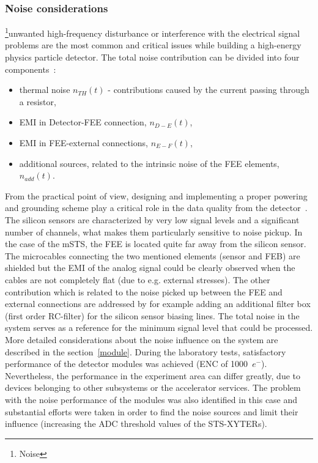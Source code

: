 \subsubsection{Noise considerations}
\footnote{Noise}{unwanted high-frequency disturbance or interference with the electrical signal} problems are the most common and critical issues while building a high-energy physics particle detector. The total noise contribution can be divided into four components~\cite{noise_twepp2008}:
\begin{itemize}
    \item thermal noise $n_{TH}(t)$ - contributions caused by the current passing through a resistor,
    \item \gls{EMI} in Detector-FEE connection, $n_{D-E}(t)$,
    \item \gls{EMI} in \gls{FEE}-external connections, $n_{E-F}(t)$,
    \item additional sources, related to the intrinsic noise of the FEE elements, $n_{add}(t)$.
\end{itemize}
From the practical point of view, designing and implementing a proper powering and grounding scheme play a critical role in the data quality from the detector~\cite{Bobillier:1159563}. The silicon sensors are characterized by very low signal levels and a significant number of channels, what makes them particularly sensitive to noise pickup. In the case of the \gls{mSTS}, the \gls{FEE} is located quite far away from the silicon sensor. The microcables connecting the two mentioned elements (sensor and \gls{FEB}) are shielded but the \gls{EMI} of the analog signal could be clearly observed when the cables are not completely flat (due to e.g. external stresses). The other contribution which is related to the noise picked up between the \gls{FEE} and external connections are addressed by for example adding an additional filter box (first order RC-filter) for the silicon sensor biasing lines. The total noise in the system serves as a reference for the minimum signal level that could be processed. More detailed considerations about the noise influence on the system are described in the section~\ref{module}. During the laboratory tests, satisfactory performance of the detector modules was achieved (\gls{ENC} of 1000~$e^{-}$). Nevertheless, the performance in the experiment area can differ greatly, due to devices belonging to other subsystems or the accelerator services. The problem with the noise performance of the modules was also identified in this case and substantial efforts were taken in order to find the noise sources and limit their influence (increasing the ADC threshold values of the STS-XYTERs). 

